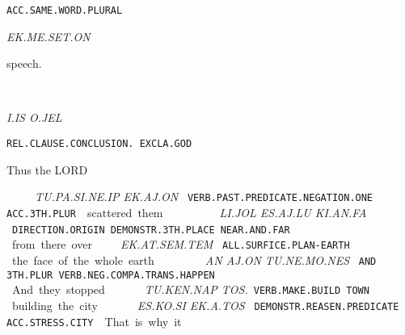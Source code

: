 {  
\ek\me\set\on\period

{\tt ACC.SAME.WORD.PLURAL }

{\it EK.ME.SET.ON }

speech.

\drie

 

\Atlani\is~\Atlano\jel 

{\it I.IS		O.JEL		 }

{\tt REL.CLAUSE.CONCLUSION.	EXCLA.GOD					 }

Thus 		the LORD 					
\drie

 

\tu\pa\si\Atlanne\ip~\ek\aj\on

{\it TU.PA.SI.NE.IP				EK.AJ.ON }

{\tt VERB.PAST.PREDICATE.NEGATION.ONE	ACC.3TH.PLUR }

scattered				them 
\drie

 

\li\jol~\es\aj\lu~\ki\an\fa

{\it LI.JOL			ES.AJ.LU		KI.AN.FA	 }

{\tt DIRECTION.ORIGIN         DEMONSTR.3TH.PLACE  NEAR.AND.FAR }

from 			there 			over 		
\drie
 

 
\at\sem\tem

{\it EK.AT.SEM.TEM }

{\tt ALL.SURFICE.PLAN-EARTH }

the face of the whole earth 


\drie

 

\an~\aj\on~\tu\Atlanne\mo\nes

{\it AN	AJ.ON		TU.NE.MO.NES		                               }

{\tt AND	3TH.PLUR	VERB.NEG.COMPA.TRANS.HAPPEN	 }

And 	they 		stopped 				 
\drie
 

\tu\ken\nap~\tos\period

{\it TU.KEN.NAP                      TOS.}

{\tt VERB.MAKE.BUILD	TOWN }

building 		the city. 
\drie

\ek\Atlana\tos~ \es\ko\si

{\it ES.KO.SI				EK.A.TOS		 }

{\tt DEMONSTR.REASEN.PREDICATE	ACC.STRESS.CITY	 }

That is why 				it 			

}
